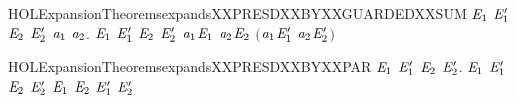 \begin{SaveVerbatim}{HOLExpansionTheoremsexpandsXXPRESDXXBYXXGUARDEDXXSUM}
\HOLTokenTurnstile{} \HOLSymConst{\HOLTokenForall{}}\ensuremath{\HOLBoundVar{E}\sb{\mathrm{1}}} \ensuremath{\HOLBoundVar{E}\sb{\mathrm{1}}\sp{\prime}} \ensuremath{\HOLBoundVar{E}\sb{\mathrm{2}}} \ensuremath{\HOLBoundVar{E}\sb{\mathrm{2}}\sp{\prime}} \ensuremath{\HOLBoundVar{a}\sb{\mathrm{1}}} \ensuremath{\HOLBoundVar{a}\sb{\mathrm{2}}}.
       \ensuremath{\HOLBoundVar{E}\sb{\mathrm{1}}}  \ensuremath{\HOLBoundVar{E}\sb{\mathrm{1}}\sp{\prime}} \HOLSymConst{\HOLTokenConj{}} \ensuremath{\HOLBoundVar{E}\sb{\mathrm{2}}}  \ensuremath{\HOLBoundVar{E}\sb{\mathrm{2}}\sp{\prime}} \HOLSymConst{\HOLTokenImp{}}
       \ensuremath{\HOLBoundVar{a}\sb{\mathrm{1}}}\HOLSymConst{\ensuremath{\ldotp}}\ensuremath{\HOLBoundVar{E}\sb{\mathrm{1}}} \HOLSymConst{\ensuremath{+}} \ensuremath{\HOLBoundVar{a}\sb{\mathrm{2}}}\HOLSymConst{\ensuremath{\ldotp}}\ensuremath{\HOLBoundVar{E}\sb{\mathrm{2}}}  \ensuremath{(}\ensuremath{\HOLBoundVar{a}\sb{\mathrm{1}}}\HOLSymConst{\ensuremath{\ldotp}}\ensuremath{\HOLBoundVar{E}\sb{\mathrm{1}}\sp{\prime}} \HOLSymConst{\ensuremath{+}} \ensuremath{\HOLBoundVar{a}\sb{\mathrm{2}}}\HOLSymConst{\ensuremath{\ldotp}}\ensuremath{\HOLBoundVar{E}\sb{\mathrm{2}}\sp{\prime}}\ensuremath{)}
\end{SaveVerbatim}
\newcommand{\HOLExpansionTheoremsexpandsXXPRESDXXBYXXGUARDEDXXSUM}{\UseVerbatim{HOLExpansionTheoremsexpandsXXPRESDXXBYXXGUARDEDXXSUM}}
\begin{SaveVerbatim}{HOLExpansionTheoremsexpandsXXPRESDXXBYXXPAR}
\HOLTokenTurnstile{} \HOLSymConst{\HOLTokenForall{}}\ensuremath{\HOLBoundVar{E}\sb{\mathrm{1}}} \ensuremath{\HOLBoundVar{E}\sb{\mathrm{1}}\sp{\prime}} \ensuremath{\HOLBoundVar{E}\sb{\mathrm{2}}} \ensuremath{\HOLBoundVar{E}\sb{\mathrm{2}}\sp{\prime}}.
       \ensuremath{\HOLBoundVar{E}\sb{\mathrm{1}}}  \ensuremath{\HOLBoundVar{E}\sb{\mathrm{1}}\sp{\prime}} \HOLSymConst{\HOLTokenConj{}} \ensuremath{\HOLBoundVar{E}\sb{\mathrm{2}}}  \ensuremath{\HOLBoundVar{E}\sb{\mathrm{2}}\sp{\prime}} \HOLSymConst{\HOLTokenImp{}}
       \ensuremath{\HOLBoundVar{E}\sb{\mathrm{1}}} \HOLSymConst{\ensuremath{\mid}} \ensuremath{\HOLBoundVar{E}\sb{\mathrm{2}}}  \ensuremath{\HOLBoundVar{E}\sb{\mathrm{1}}\sp{\prime}} \HOLSymConst{\ensuremath{\mid}} \ensuremath{\HOLBoundVar{E}\sb{\mathrm{2}}\sp{\prime}}
\end{SaveVerbatim}
\newcommand{\HOLExpansionTheoremsexpandsXXPRESDXXBYXXPAR}{\UseVerbatim{HOLExpansionTheoremsexpandsXXPRESDXXBYXXPAR}}
